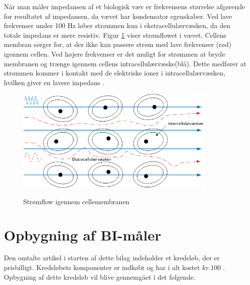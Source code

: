 Når man måler impedansen af et biologisk væv er frekvensens størrelse afgørende for resultatet af impedansen, da vævet har kondensator egenskaber. Ved lave frekvenser under 100 Hz løber strømmen kun i ekstracellulærvæsken, da den totale impedans er mere resistiv. Figur \ref{fig:celler} viser strømflowet i vævet.  Cellens membran sørger for, at der ikke kan passere strøm med lave frekvenser (rød) igennem cellen. Ved højere frekvenser er det muligt for strømmen at bryde membranen og trænge igennem cellens intracellulærvæske(blå). Dette medfører at strømmen kommer i kontakt med de elektriske ioner i intracellulærvæsken, hvilken giver en lavere impedans \citep{Brantlov2017}. 



\begin{figure}[H]
\centering
{\includegraphics[width=10cm]
{Figure/celler}}
\caption{Strømflow igennem cellemembranen}
\label{fig:celler}
\end{figure}










\section{Opbygning af BI-måler}

Den omtalte artikel i starten af dette bilag indeholder et kredsløb, der er prisbilligt. Kredsløbets komponenter er indkøbt og har i alt kostet $ kr. 100$ \cite{Nr}. Opbygning af dette kredsløb vil blive gennemgået i det følgende. 



